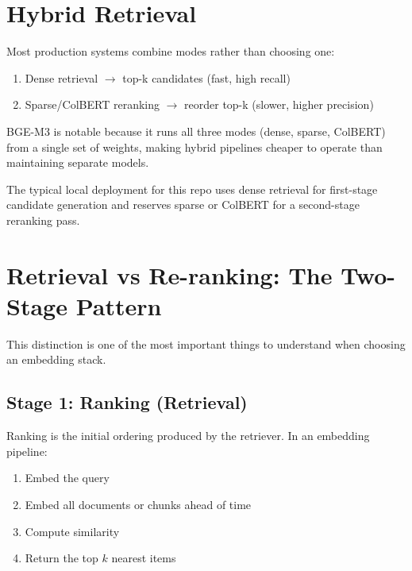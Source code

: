 \section{Hybrid Retrieval}

Most production systems combine modes rather than choosing one:

\begin{enumerate}
    \item Dense retrieval $\to$ top-k candidates (fast, high recall)
    \item Sparse/ColBERT reranking $\to$ reorder top-k (slower, higher precision)
\end{enumerate}

BGE-M3 is notable because it runs all three modes (dense, sparse, ColBERT) from a single set
of weights, making hybrid pipelines cheaper to operate than maintaining separate models.

The typical local deployment for this repo uses dense retrieval for first-stage candidate
generation and reserves sparse or ColBERT for a second-stage reranking pass.

\section{Retrieval vs Re-ranking: The Two-Stage Pattern}

This distinction is one of the most important things to understand when choosing an embedding
stack.

\subsection{Stage 1: Ranking (Retrieval)}

Ranking is the initial ordering produced by the retriever. In an embedding pipeline:

\begin{enumerate}
    \item Embed the query
    \item Embed all documents or chunks ahead of time
    \item Compute similarity
    \item Return the top $k$ nearest items
\end{enumerate}

